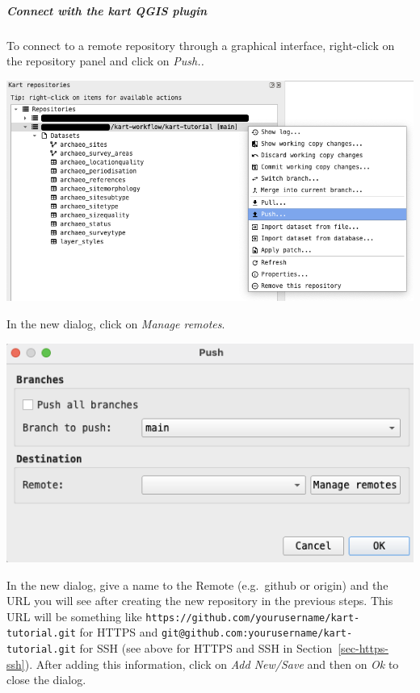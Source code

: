 \documentclass[
  letterpaper,
  DIV=11,
  numbers=noendperiod]{scrartcl}
\let\oldsubparagraph\subparagraph
\renewcommand{\subparagraph}[1]{\oldsubparagraph{#1}\mbox{}}
\begin{document}
\subparagraph{Connect with the kart QGIS
plugin}\label{connect-with-the-kart-qgis-plugin}

To connect to a remote repository through a graphical interface,
right-click on the repository panel and click on \emph{Push..}

\begin{center}
\includegraphics{img/kart-panel-push.png}
\end{center}

In the new dialog, click on \emph{Manage remotes}.

\begin{center}
\includegraphics{img/kart-panel-push-manage.png}
\end{center}

In the new dialog, give a name to the Remote (e.g.~github or origin) and
the URL you will see after creating the new repository in the previous
steps. This URL will be something like
\texttt{https://github.com/yourusername/kart-tutorial.git} for HTTPS and
\texttt{git@github.com:\textasciigrave{}\textasciigrave{}yourusername\textasciigrave{}\textasciigrave{}/kart-tutorial.git}
for SSH (see above for HTTPS and SSH in Section~\ref{sec-https-ssh}).
After adding this information, click on \emph{Add New/Save} and then on
\emph{Ok} to close the dialog.
\end{document}

